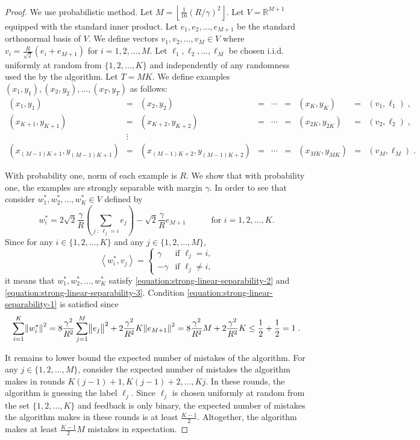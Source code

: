 \documentclass[12pt]{article}
\newcommand{\R}{\mathbb{R}}  %
\newcommand{\ip}[2]{\left\langle #1, #2 \right\rangle} %
\begin{document}
\begin{proof}
We use probabilistic method. Let $M = \left\lfloor \frac{1}{16} (R/\gamma)^2 \right\rfloor$.
Let $V = \R^{M+1}$ equipped with the standard inner product.  Let $e_1, e_2,
\dots, e_{M+1}$ be the standard orthonormal basis of $V$. We define
vectors $v_1, v_2, \dots, v_M \in V$ where $v_i = \frac{R}{\sqrt{2}}(e_i +
e_{M+1})$ for $i=1,2,\dots,M$. Let $\ell_1, \ell_2, \dots, \ell_M$ be chosen
i.i.d. uniformly at random from $\{1,2,\dots,K\}$ and independently of any
randomness used the by the algorithm. Let $T = M K$. We define examples $(x_1,
y_1), (x_2, y_2), \dots, (x_T, y_T)$ as follows:
$$
\begin{array}{lclclclcl}
(x_1, y_1) & = & (x_2, y_2) & = & \cdots & = & (x_K, y_K) & = & (v_1, \ell_1) \; , \\
(x_{K+1},y_{K+1}) & = & (x_{K+2}, y_{K+2}) & = & \cdots & = & (x_{2K}, y_{2K}) & = & (v_2, \ell_2) \; , \\
& \vdots & \\
(x_{(M-1)K+1}, y_{(M-1)K+1})  & = & (x_{(M-1)K+2}, y_{(M-1)K+2}) & = & \cdots & = & (x_{MK}, y_{MK}) & = & (v_M, \ell_M) \; .
\end{array}
$$

With probability one, norm of each example is $R$. We show that with probability
one, the examples are strongly separable with margin $\gamma$. In order to see
that consider $w_1^*, w_2^*, \dots, w_K^* \in V$ defined by
$$
w_i^* = 2 \sqrt{2} \frac{\gamma}{R} \left( \sum_{j ~:~ \ell_j = i} e_j \right) - \sqrt{2} \frac{\gamma}{R} e_{M+1} \qquad \quad \text{for $i=1,2,\dots,K$.}
$$
Since for any $i \in \{1,2,\dots,K\}$ and any $j \in \{1,2,\dots,M\}$,
$$
\ip{w_i^*}{v_j} =
\begin{cases}
\gamma & \text{if $\ell_j = i$,} \\
- \gamma & \text{if $\ell_j \neq i$,}
\end{cases}
$$
it means that $w_1^*, w_2^*, \dots, w_K^*$ satisfy
\eqref{equation:strong-linear-separability-2} and
\eqref{equation:strong-linear-separability-3}. Condition \eqref{equation:strong-linear-separability-1}
is satisfied since
$$
\sum_{i=1}^K \norm{w_i^*}^2
= 8 \frac{\gamma^2}{R^2} \sum_{j=1}^M \norm{e_j}^2 + 2 \frac{\gamma^2}{R^2} K \norm{e_{M+1}}^2
= 8 \frac{\gamma^2}{R^2} M + 2 \frac{\gamma^2}{R^2} K
\le \frac{1}{2} + \frac{1}{2}
= 1 \; .
$$

It remains to lower bound the expected number of mistakes of the algorithm. For
any $j \in \{1,2,\dots,M\}$, consider the expected number of mistakes the
algorithm makes in rounds $K(j-1) + 1, K(j-1) + 2, \dots, Kj$. In these rounds,
the algorithm is guessing the label $\ell_j$. Since $\ell_j$ is chosen uniformly
at random from the set $\{1,2,\dots,K\}$ and feedback is only binary, the
expected number of mistakes the algorithm makes in these rounds is at least
$\frac{K-1}{2}$. Altogether, the algorithm makes at least $\frac{K-1}{2} M$
mistakes in expectation.


\end{proof}
\end{document}
